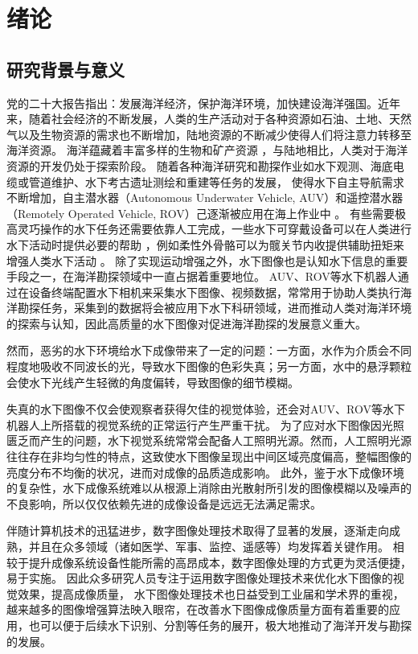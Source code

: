 
\chapter{绪论}

\section{研究背景与意义}
党的二十大报告指出：发展海洋经济，保护海洋环境，加快建设海洋强国。近年来，随着社会经济的不断发展，人类的生产活动对于各种资源如石油、土地、天然气以及生物资源的需求也不断增加，陆地资源的不断减少使得人们将注意力转移至海洋资源。
海洋蕴藏着丰富多样的生物和矿产资源 \cite{ocean_energy}，与陆地相比，人类对于海洋资源的开发仍处于探索阶段。
随着各种海洋研究和勘探作业如水下观测、海底电缆或管道维护、水下考古遗址测绘和重建等任务的发展，
使得水下自主导航需求不断增加，自主潜水器（Autonomous Underwater Vehicle, AUV）和遥控潜水器（Remotely Operated Vehicle, ROV）己逐渐被应用在海上作业中 \cite{auv}\cite{rov}。
有些需要极高灵巧操作的水下任务还需要依靠人工完成，一些水下可穿戴设备可以在人类进行水下活动时提供必要的帮助 \cite{Xia2022}，例如柔性外骨骼可以为髋关节内收提供辅助扭矩来增强人类水下活动 \cite{Xia2023}。
除了实现运动增强之外，水下图像也是认知水下信息的重要手段之一，在海洋勘探领域中一直占据着重要地位。\cite{underwater_perception}
AUV、ROV等水下机器人通过在设备终端配置水下相机来采集水下图像、视频数据，常常用于协助人类执行海洋勘探任务，采集到的数据将会被应用下水下科研领域，进而推动人类对海洋环境的探索与认知，因此高质量的水下图像对促进海洋勘探的发展意义重大。

然而，恶劣的水下环境给水下成像带来了一定的问题：一方面，水作为介质会不同程度地吸收不同波长的光，导致水下图像的色彩失真；另一方面，水中的悬浮颗粒会使水下光线产生轻微的角度偏转，导致图像的细节模糊。

失真的水下图像不仅会使观察者获得欠佳的视觉体验，还会对AUV、ROV等水下机器人上所搭载的视觉系统的正常运行产生严重干扰。
为了应对水下图像因光照匮乏而产生的问题，水下视觉系统常常会配备人工照明光源。然而，人工照明光源往往存在非均匀性的特点，这致使水下图像呈现出中间区域亮度偏高，整幅图像的亮度分布不均衡的状况，进而对成像的品质造成影响。
此外，鉴于水下成像环境的复杂性，水下成像系统难以从根源上消除由光散射所引发的图像模糊以及噪声的不良影响，所以仅仅依赖先进的成像设备是远远无法满足需求。

伴随计算机技术的迅猛进步，数字图像处理技术取得了显著的发展，逐渐走向成熟，并且在众多领域（诸如医学、军事、监控、遥感等）均发挥着关键作用。
相较于提升成像系统设备性能所需的高昂成本，数字图像处理的方式更为灵活便捷，易于实施。
因此众多研究人员专注于运用数字图像处理技术来优化水下图像的视觉效果，提高成像质量，
水下图像处理技术也日益受到工业届和学术界的重视，越来越多的图像增强算法映入眼帘，在改善水下图像成像质量方面有着重要的应用，也可以便于后续水下识别、分割等任务的展开，极大地推动了海洋开发与勘探的发展。

